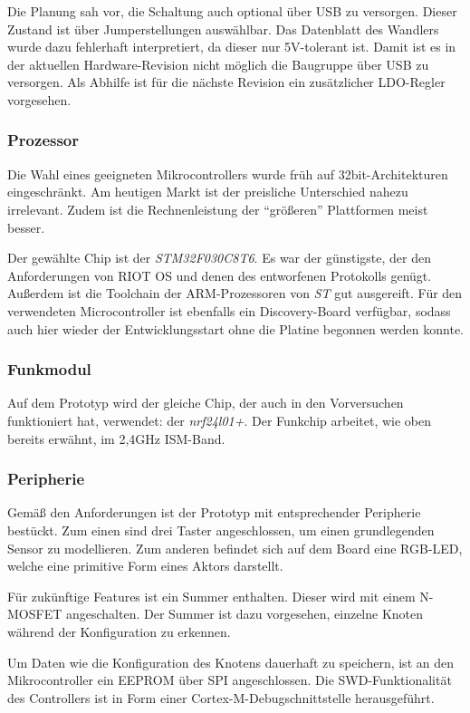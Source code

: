\documentclass{IEEEtran}
\begin{document}
Die Planung sah vor, die Schaltung auch optional über USB zu versorgen.
Dieser Zustand ist über Jumperstellungen auswählbar.
Das Datenblatt des Wandlers wurde dazu fehlerhaft interpretiert, da dieser nur 5V-tolerant ist.
Damit ist es in der aktuellen Hardware-Revision nicht möglich die Baugruppe über USB zu versorgen.
Als Abhilfe ist für die nächste Revision ein zusätzlicher LDO-Regler vorgesehen.

\subsubsection{Prozessor}
Die Wahl eines geeigneten Mikrocontrollers wurde früh auf 32bit-Architekturen eingeschränkt.
Am heutigen Markt ist der preisliche Unterschied nahezu irrelevant.
Zudem ist die Rechnenleistung der \enquote{größeren} Plattformen meist besser.

Der gewählte Chip ist der \emph{STM32F030C8T6}.
Es war der günstigste, der den Anforderungen von RIOT OS und denen des entworfenen Protokolls genügt.
Außerdem ist die Toolchain der ARM-Prozessoren von \emph{ST} gut ausgereift.
Für den verwendeten Microcontroller ist ebenfalls ein Discovery-Board verfügbar, sodass auch hier wieder der Entwicklungsstart ohne die Platine begonnen werden konnte.

\subsubsection{Funkmodul}
Auf dem Prototyp wird der gleiche Chip, der auch in den Vorversuchen funktioniert hat, verwendet: der \emph{nrf24l01+}. Der Funkchip arbeitet, wie oben bereits erwähnt, im 2,4GHz ISM-Band.


\subsubsection{Peripherie}
Gemäß den Anforderungen ist der Prototyp mit entsprechender Peripherie bestückt.
Zum einen sind drei Taster angeschlossen, um einen grundlegenden Sensor zu modellieren.
Zum anderen befindet sich auf dem Board eine RGB-LED, welche eine primitive Form eines Aktors darstellt.

Für zukünftige Features ist ein Summer enthalten.
Dieser wird mit einem N-MOSFET angeschalten.
Der Summer ist dazu vorgesehen, einzelne Knoten während der Konfiguration zu erkennen.

Um Daten wie die Konfiguration des Knotens dauerhaft zu speichern, ist an den Mikrocontroller ein EEPROM über SPI angeschlossen.
Die SWD-Funktionalität des Controllers ist in Form einer Cortex-M-Debugschnittstelle herausgeführt.
\end{document}

